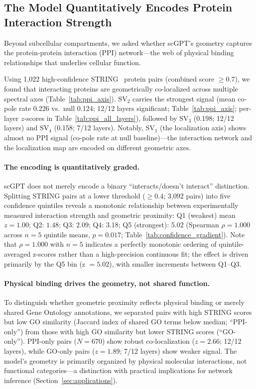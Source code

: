 \documentclass[10pt,twocolumn]{article}
\newcommand{\SV}[1]{\mathrm{SV}_{#1}}
\begin{document}
\subsection{The Model Quantitatively Encodes Protein Interaction Strength}
\label{sec:ppi}

Beyond subcellular compartments, we asked whether scGPT's geometry captures the protein-protein interaction (PPI) network---the web of physical binding relationships that underlies cellular function.

Using 1{,}022 high-confidence STRING~\citep{szklarczyk2023string} protein pairs (combined score $\geq 0.7$), we found that interacting proteins are geometrically co-localized across multiple spectral axes (Table~\ref{tab:ppi_axis}).
$\SV{2}$ carries the strongest signal (mean co-pole rate 0.226 vs.\ null 0.124; 12/12 layers significant; Table~\ref{tab:ppi_axis}; per-layer $z$-scores in Table~\ref{tab:ppi_all_layers}), followed by $\SV{3}$ (0.198; 12/12 layers) and $\SV{4}$ (0.158; 7/12 layers).
Notably, $\SV{1}$ (the localization axis) shows almost no PPI signal (co-pole rate at null baseline)---the interaction network and the localization map are encoded on different geometric axes.

\paragraph{The encoding is quantitatively graded.}
scGPT does not merely encode a binary ``interacts/doesn't interact'' distinction.
Splitting STRING pairs at a lower threshold ($\geq 0.4$; 3{,}092 pairs) into five confidence quintiles reveals a monotonic relationship between experimentally measured interaction strength and geometric proximity: Q1 (weakest) mean $z = 1.00$; Q2: $1.48$; Q3: $2.09$; Q4: $3.18$; Q5 (strongest): $5.02$ (Spearman $\rho = 1.000$ across $n = 5$ quintile means, $p = 0.017$; Table~\ref{tab:confidence_gradient}).
Note that $\rho = 1.000$ with $n = 5$ indicates a perfectly monotonic ordering of quintile-averaged z-scores rather than a high-precision continuous fit; the effect is driven primarily by the Q5 bin (z $= 5.02$), with smaller increments between Q1--Q3.

\paragraph{Physical binding drives the geometry, not shared function.}
To distinguish whether geometric proximity reflects physical binding or merely shared Gene Ontology annotations, we separated pairs with high STRING scores but low GO similarity (Jaccard index of shared GO terms below median; ``PPI-only'') from those with high GO similarity but lower STRING scores (``GO-only'').
PPI-only pairs ($N = 670$) show robust co-localization ($z = 2.66$; 12/12 layers), while GO-only pairs ($z = 1.89$; 7/12 layers) show weaker signal.
The model's geometry is primarily organized by physical molecular interactions, not functional categories---a distinction with practical implications for network inference (Section~\ref{sec:applications}).
\end{document}
